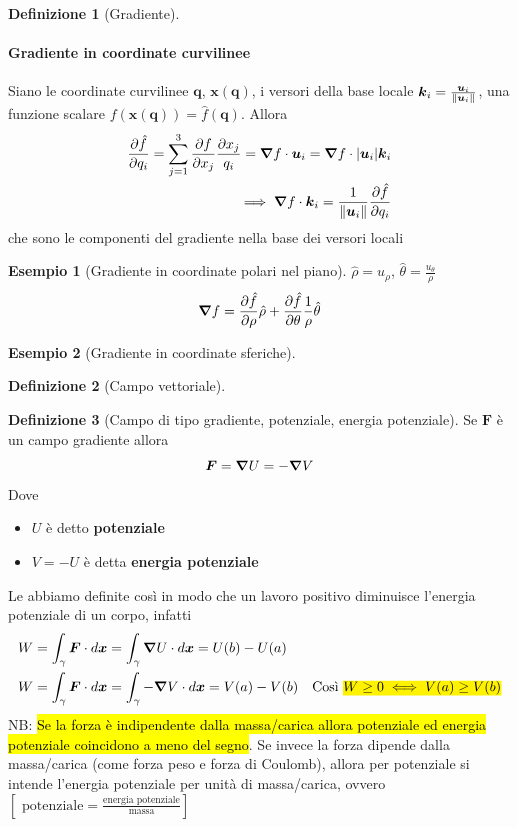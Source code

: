 \documentclass[a4paper,10pt]{article}
\theoremstyle{definition}
\newcommand{\bv}{\boldsymbol} %
\theoremstyle{indentdefinition}
\newtheorem{defn}{Definizione}[section]
\theoremstyle{indenttheorem}
\theoremstyle{myremark}
\newtheorem{example*}{Esempio}
\theoremstyle{indentgeneral}
\begin{document}
\begin{defn}[Gradiente]
\end{defn}

\paragraph{Gradiente in coordinate curvilinee} Siano le coordinate curvilinee $\bv{q}$, $\bv{x}(\bv{q})$, i versori della base locale $\bv{k}_i=\frac{\bv{u}_i}{\norm{\bv{u}_i}}$, una funzione scalare $f(\bv{x}(\bv{q}))=\hat{f}(\bv{q})$. Allora
\begin{align*}
\frac{\partial \hat{f}}{\partial q_i}=\sum_{j=1}^3\frac{\partial f}{\partial x_j}\frac{\partial x_j}{q_i}=\grad f\cdot\bv{u}_i=\grad f\cdot \abs{\bv{u}_i}\bv{k}_i \\ 
\implies \grad f\cdot\bv{k}_i=\frac{1}{\norm{\bv{u}_i}}\frac{\partial \hat{f}}{\partial q_i}
\end{align*}
che sono le componenti del gradiente nella base dei versori locali

\begin{example*}[Gradiente in coordinate polari nel piano]
$\hat{\rho}=u_\rho$, $\hat{\theta}=\frac{u_\theta}{\rho}$
    $$\grad f=\frac{\partial \hat{f}}{\partial \rho}\hat{\rho}+\frac{\partial \hat{f}}{\partial \theta}\frac{1}{\rho}\hat{\theta}$$
\end{example*}

\begin{example*}[Gradiente in coordinate sferiche]  
\end{example*}

\begin{defn}[Campo vettoriale]
\end{defn}

\begin{defn}[Campo di tipo gradiente, potenziale, energia potenziale]
Se $\bv{F}$ è un campo gradiente allora
$$\bv{F}=\grad U=-\grad V$$
Dove 
\begin{itemize}
    \item $U$ è detto \textbf{potenziale}
    \item $V=-U$ è detta \textbf{energia potenziale}
\end{itemize}
Le abbiamo definite così in modo che un lavoro positivo diminuisce l'energia potenziale di un corpo, infatti
\begin{align*}
    W&=\int_\gamma\bv{F}\cdot d\bv{x}=\int_\gamma\grad U\cdot d\bv{x}=U(b)-U(a) \\
    W&=\int_\gamma\bv{F}\cdot d\bv{x}=\int_\gamma-\grad V\cdot d\bv{x}=V(a)-V(b)\quad \text{Così \hl{$W\ge 0\iff V(a)\ge V(b)$}}
\end{align*}
NB: \hl{Se la forza è indipendente dalla massa/carica allora potenziale ed energia potenziale coincidono a meno del segno}. Se invece la forza dipende dalla massa/carica (come forza peso e forza di Coulomb), allora per potenziale si intende l'energia potenziale per unità di massa/carica, ovvero $[\text{ potenziale}=\frac{\text{energia potenziale}}{\text{massa}}]$
\end{defn}
\end{document}
